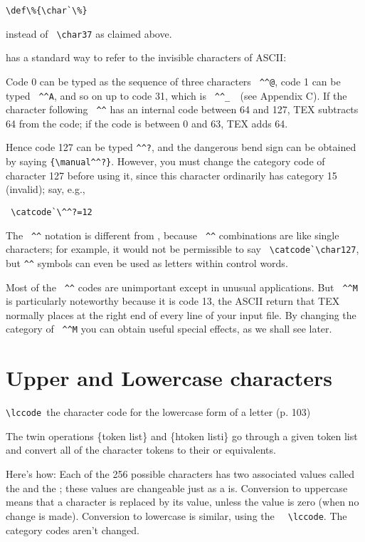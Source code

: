 \verb+\def\%{\char`\%}+

instead of \verb+ \char37+  as claimed above.


\tex has a standard way to refer to the invisible characters of ASCII: 

Code 0 can be typed as the sequence of three characters \verb+ ^^@+, code 1 can be typed
\verb+ ^^A+, and so on up to code 31, which is \verb+ ^^_  +(see Appendix C). If the character following
\verb+ ^^+ has an internal code between 64 and 127, TEX subtracts 64 from the code; if the
code is between 0 and 63, TEX adds 64. 

Hence code 127 can be typed \verb+^^?+, and
the dangerous bend sign can be obtained by saying \verb+{\manual^^?}+. However, you must
change the category code of character 127 before using it, since this character ordinarily
has category 15 (invalid); say, e.g., 

\verb+ \catcode`\^^?=12 +

The \verb+ ^^+ notation is different from
, because \verb+ ^^+ combinations are like single characters; for example, it would not
be permissible to say \verb+ \catcode`\char127+, but \verb+^^+ symbols can even be used as letters
within control words.

Most of the \verb+ ^^+ codes are unimportant except in unusual applications. But
\verb+ ^^M+ is particularly noteworthy because it is code 13, the ASCII return that
TEX normally places at the right end of every line of your input file. By changing the
category of \verb+ ^^M+  you can obtain useful special effects, as we shall see later.

\section{Upper and Lowercase characters}

\verb*+\lccode +the character code for the lowercase form of a letter (p. 103)

The twin operations \{token list\} and \{htoken listi\}
go through a given token list and convert all of the character tokens to their
  or  equivalents. 

Here's how: Each of the 256 possible characters
has two associated values called the  and the ; these values are
changeable just as a  is. Conversion to uppercase means that a character
is replaced by its  value, unless the  value is zero (when no change
is made). Conversion to lowercase is similar, using the
\verb+  \lccode+. The category codes
aren't changed. 

